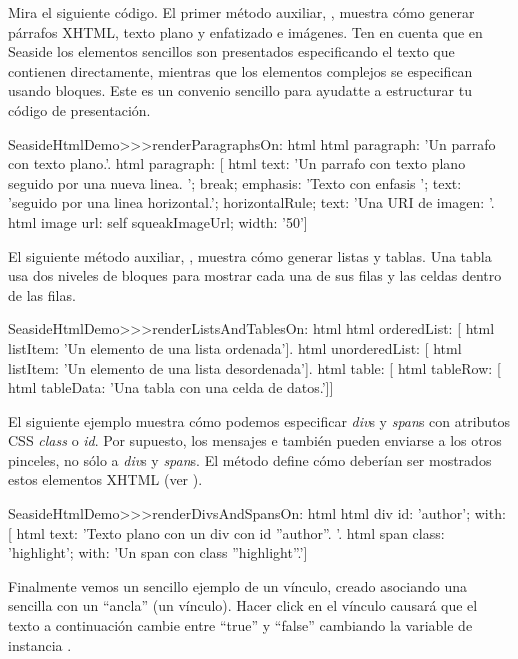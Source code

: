 \documentclass[a4paper,10pt,twoside]{book}
\begin{document}
Mira el siguiente código.
El primer método auxiliar, , muestra cómo generar párrafos XHTML, texto plano y enfatizado e imágenes.
Ten en cuenta que en Seaside los elementos sencillos son presentados especificando el texto que contienen directamente, mientras que los elementos complejos se especifican usando bloques.
Este es un convenio sencillo para ayudatte a estructurar tu código de presentación.

\begin{code}{}
SeasideHtmlDemo>>>renderParagraphsOn: html 
	html paragraph: 'Un parrafo con texto plano.'.
	html paragraph: [
		html
			text: 'Un parrafo con texto plano seguido por una nueva linea. ';
			break;
			emphasis: 'Texto con enfasis ';
			text: 'seguido por una linea horizontal.';
			horizontalRule;
			text: 'Una URI de imagen: '.
		html image
			url: self squeakImageUrl;
			width: '50']
\end{code}

El siguiente método auxiliar, , muestra cómo generar listas y tablas.
Una tabla usa dos niveles de bloques para mostrar cada una de sus filas y las celdas dentro de las filas.

\begin{code}{}
SeasideHtmlDemo>>>renderListsAndTablesOn: html 
	html orderedList: [
		html listItem: 'Un elemento de una lista ordenada'].
	html unorderedList: [
		html listItem: 'Un elemento de una lista desordenada'].
	html table: [
		html tableRow: [
			html tableData: 'Una tabla con una celda de datos.']]
\end{code}

El siguiente ejemplo muestra cómo podemos especificar \emph{div}s y \emph{span}s con atributos CSS \emph{class} o \emph{id}.
Por supuesto, los mensajes  e  también pueden enviarse a los otros pinceles, no sólo a \emph{div}s y \emph{span}s.
El método  define cómo deberían ser mostrados estos elementos XHTML (ver ).

\begin{code}{}
SeasideHtmlDemo>>>renderDivsAndSpansOn: html 
	html div
		id: 'author';
		with: [
			html text: 'Texto plano con un div con id ''author''. '.
			html span
				class: 'highlight';
				with: 'Un span con class ''highlight''.']
\end{code}

Finalmente vemos un sencillo ejemplo de un vínculo, creado asociando una sencilla  con un ``ancla'' (\ie un vínculo).
Hacer click en el vínculo causará que el texto a continuación cambie entre ``true'' y ``false'' cambiando la variable de instancia .
\end{document}
